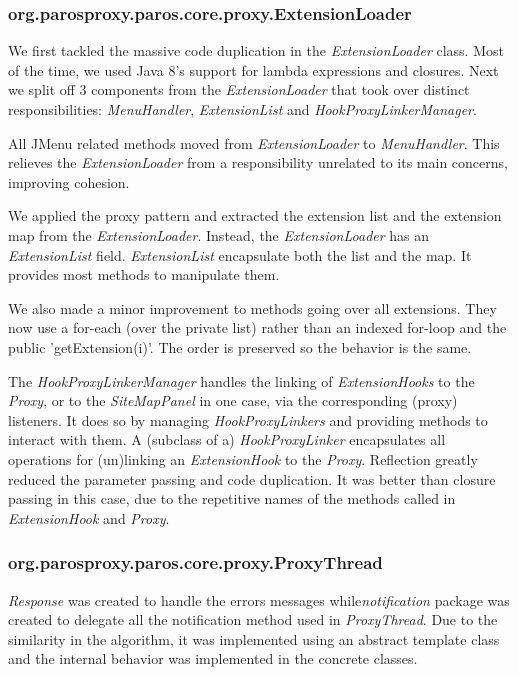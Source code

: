 \subsubsection{org.parosproxy.paros.core.proxy.ExtensionLoader}
We first tackled the massive code duplication in  the \textit{ExtensionLoader} class. Most of the time, we used Java 8's support for lambda expressions and closures. Next we split off 3 components from the \textit{ExtensionLoader} that took over distinct responsibilities: \textit{MenuHandler}, \textit{ExtensionList} and \textit{HookProxyLinkerManager}.
\par
All JMenu related methods moved from \textit{ExtensionLoader} to \textit{MenuHandler}. This relieves the \textit{ExtensionLoader} from a responsibility unrelated to its main concerns, improving cohesion.
\par
We applied the proxy pattern and extracted the extension list and the extension map from the \textit{ExtensionLoader}. Instead, the \textit{ExtensionLoader} has an \textit{ExtensionList} field. \textit{ExtensionList} encapsulate both the list and the map. It provides most methods to manipulate them.
\par
We also made a minor improvement to methods going over all extensions. They now use a for-each (over the private list) rather than an indexed for-loop and the public 'getExtension(i)'. The order is preserved so the behavior is the same.
\par
The \textit{HookProxyLinkerManager} handles the linking of \textit{ExtensionHooks} to the \textit{Proxy}, or to the \textit{SiteMapPanel} in one case, via the corresponding (proxy) listeners. It does so by managing \textit{HookProxyLinkers} and providing methods to interact with them.
A (subclass of a) \textit{HookProxyLinker} encapsulates all operations for (un)linking an \textit{ExtensionHook} to the \textit{Proxy}. Reflection greatly reduced the parameter passing and code duplication. It was better than closure passing in this case, due to the repetitive names of the methods called in \textit{ExtensionHook} and \textit{Proxy}.
\subsubsection{org.parosproxy.paros.core.proxy.ProxyThread}

\textit{Response} was created to handle the errors messages while\textit{notification} package was created to delegate all the notification method used in \textit{ProxyThread}. Due to the similarity in the algorithm, it was implemented using an abstract template class and the internal behavior was implemented in the concrete classes.
